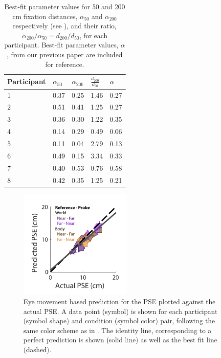 \begin{table}
    \begin{tabular}{l|lll|l}
	Participant & $\alpha_{50}$ & $\alpha_{200}$ & $\frac{d_{200}}{d_{50}}$ & $\alpha$ \\
    \hline
	1 & 0.37 & 0.25 & 1.46 & 0.27 \\
	2 & 0.51 & 0.41 & 1.25 & 0.27 \\
	3 & 0.36 & 0.30 & 1.22 & 0.35 \\
	4 & 0.14 & 0.29 & 0.49 & 0.06 \\
	5 & 0.11 & 0.04 & 2.79 & 0.13 \\
	6 & 0.49 & 0.15 & 3.34 & 0.33\\
	7 & 0.40 & 0.53 & 0.76 & 0.58 \\
	8 & 0.42 & 0.35 & 1.25 & 0.21 \\
    \end{tabular}

    \caption{Best-fit parameter values for 50 and 200 \si{\centi\metre} fixation distances, $\alpha_{50}$ and $\alpha_{200}$ respectively (see ), and their ratio, $\alpha_{200} / \alpha_{50} = d_{200} / d_{50}$, for each participant. Best-fit parameter values, $\alpha$, from our previous paper \protect\cite{clemens2015a} are included for reference.}

    \label{p4:tab2}
\end{table}

\begin{figure}
    \includegraphics[width=0.5\textwidth]{src/paper4/p4_figure4.pdf}

	\caption{Eye movement based prediction for the PSE plotted against the actual PSE. A data point (symbol) is shown for each participant (symbol shape) and condition (symbol color) pair, following the same color scheme as in . The identity line, corresponding to a perfect prediction is shown (solid line) as well as the best fit line (dashed).}
	\label{p4:fig4}
\end{figure}

